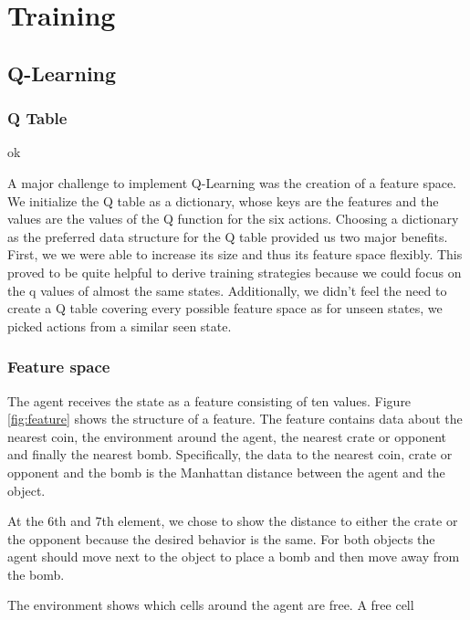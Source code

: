 \documentclass[
	letterpaper, %
	12pt, %
]{CSUniSchoolLabReport}
\begin{document}

\section{Training}
\subsection{Q-Learning}

\subsubsection*{Q Table}

ok \cite{DynRewardShaping}

A major challenge to implement Q-Learning was the creation of a feature space.
We initialize the Q table as a dictionary, whose keys are the features and the values are the values of the Q function for the six
actions.
Choosing a dictionary as the preferred data structure for the Q table provided us
two major benefits.
First, we we were able to increase its size and thus its feature space flexibly.
This proved to be quite helpful to derive training strategies because we
could focus on the q values of almost the same states.
Additionally, we didn't feel the need to create a Q table covering every possible
feature space as for unseen states, we picked actions from a similar seen state.

\subsubsection*{Feature space}
The agent receives the state as a feature consisting of ten values. Figure \ref{fig:feature} shows
the structure of a feature. The feature contains data about the nearest coin, the environment around
the agent, the nearest crate or opponent and finally the nearest bomb.
Specifically, the data to the nearest coin, crate or opponent and the bomb is the Manhattan distance
between the agent and the object.

At the 6th and 7th element, we chose to show the distance to either the crate or the opponent because
the desired behavior is the same. For both objects the agent should move next to the object to
place a bomb and then move away from the bomb.

The environment shows which cells around the agent are free. A free cell
\end{document}
